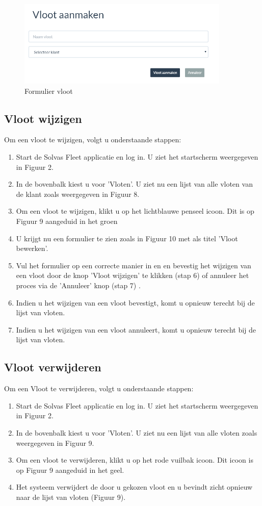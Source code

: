 \documentclass[11pt,openany]{article}
\begin{document}
\begin{figure}
	\centering
	\includegraphics[width=0.9\textwidth]{img/fig_j.png}
	\caption{Formulier vloot}
\end{figure}
\newpage

\subsection{Vloot wijzigen}
Om een vloot te wijzigen, volgt u onderstaande stappen:
\begin{enumerate}
	\item Start de Solvas Fleet applicatie en log in. U ziet het startscherm weergegeven in Figuur 2.
	\item In de bovenbalk kiest u voor 'Vloten'. U ziet nu een lijst van alle vloten van de klant zoals weergegeven in Figuur 8.
	\item Om een vloot te wijzigen, klikt u op het lichtblauwe penseel icoon. Dit is op Figuur 9 aangeduid in het groen
	\item U krijgt nu een formulier te zien zoals in Figuur 10 met als titel 'Vloot bewerken'.
	\item Vul het formulier op een correcte manier in en en bevestig het wijzigen van een vloot door de knop 'Vloot wijzigen' te klikken (stap 6) of annuleer het proces via de 'Annuleer' knop (stap 7) .
	\item Indien u het wijzigen van een vloot bevestigt, komt u opnieuw terecht bij de lijst van vloten.
	\item Indien u het wijzigen van een vloot annuleert, komt u opnieuw terecht bij de lijst van vloten. 
\end{enumerate}

\subsection{Vloot verwijderen}
Om een Vloot te verwijderen, volgt u onderstaande stappen:
\begin{enumerate}
	\item Start de Solvas Fleet applicatie en log in. U ziet het startscherm weergegeven in Figuur 2.
	\item In de bovenbalk kiest u voor 'Vloten'. U ziet nu een lijst van alle vloten zoals weergegeven in Figuur 9.
	\item Om een vloot te verwijderen, klikt u op het rode vuilbak icoon. Dit icoon is op Figuur 9 aangeduid in het geel.
	\item Het systeem verwijdert de door u gekozen vloot en u bevindt zicht opnieuw naar de lijst van vloten (Figuur 9).
\end{enumerate}
\end{document}
